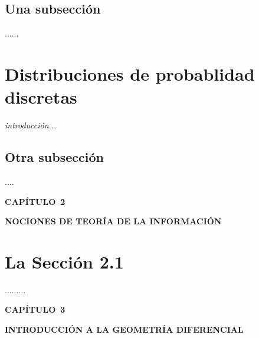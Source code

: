 \documentclass[10pt]{article}
\begin{document}
\subsection{Una subsecci\'on}

......


\vspace{1.5pt}
\section{Distribuciones de probablidad discretas}
\label{s:distprobdisc}

\emph{introducci\'on...}

\vspace{1.5pt}
\subsection{Otra subsecci\'on}

....

\newpage

{\LARGE
\noindent \textbf{CAP\'ITULO~2}

\noindent \textbf{NOCIONES DE TEOR\'IA DE LA INFORMACI\'ON}
} 


\vspace{1.5pt}
\section{La Secci\'on 2.1}
\label{s:2.1}

.........


\newpage


{\LARGE
\noindent \textbf{CAP\'ITULO~3}

\noindent \textbf{INTRODUCCI\'ON A LA GEOMETR\'IA DIFERENCIAL}
} 
\end{document}
